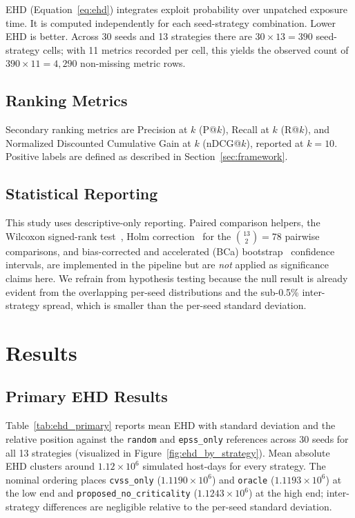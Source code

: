 \documentclass[journal]{IEEEtran}
\begin{document}
EHD (Equation~\ref{eq:ehd}) integrates exploit probability over
unpatched exposure time.  It is computed independently for each
seed-strategy combination.  Lower EHD is better.  Across 30
seeds and 13 strategies there are $30 \times 13 = 390$
seed-strategy cells; with 11 metrics recorded per cell, this
yields the observed count of $390 \times 11 = 4{,}290$ non-missing
metric rows.

\subsection{Ranking Metrics}

Secondary ranking metrics are Precision at $k$ (P@$k$),
Recall at $k$ (R@$k$), and Normalized Discounted Cumulative Gain
at $k$ (nDCG@$k$), reported at $k = 10$.  Positive labels
are defined as described in Section~\ref{sec:framework}.

\subsection{Statistical Reporting}

This study uses descriptive-only reporting.  Paired comparison
helpers, the Wilcoxon signed-rank test~\cite{wilcoxon1945}, Holm
correction~\cite{holm1979} for the $\binom{13}{2} = 78$ pairwise
comparisons, and bias-corrected and accelerated (BCa)
bootstrap~\cite{efron1987better} confidence intervals, are
implemented in the pipeline but are \emph{not} applied as
significance claims here.  We refrain from hypothesis testing
because the null result is already evident from the overlapping
per-seed distributions and the sub-0.5\% inter-strategy spread,
which is smaller than the per-seed standard deviation.

\section{Results}
\label{sec:results}

\subsection{Primary EHD Results}

Table~\ref{tab:ehd_primary} reports mean EHD with standard
deviation and the relative position against the \texttt{random}
and \texttt{epss\_only} references across 30 seeds for all 13
strategies (visualized in Figure~\ref{fig:ehd_by_strategy}).
Mean absolute EHD clusters around $1.12 \times 10^6$ simulated
host-days for every strategy.  The nominal ordering places
\texttt{cvss\_only} ($1.1190 \times 10^6$) and \texttt{oracle}
($1.1193 \times 10^6$) at the low end and
\texttt{proposed\_no\_criticality} ($1.1243 \times 10^6$) at the
high end; inter-strategy differences are negligible relative to
the per-seed standard deviation.
\end{document}
